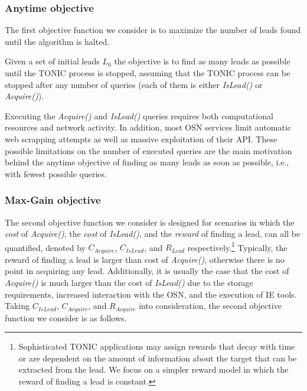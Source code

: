 \documentclass[journal]{IEEEtran}
\newcommand{\islead}[1]{{\em IsLead(#1)}}
\newcommand{\acquire}[1]{{\em Acquire(#1)}}
\begin{document}


\subsubsection{Anytime objective}

The first objective function we consider is to maximize the number of leads found until the algorithm is halted. 



\begin{definition}
Given a set of initial leads \(L_0\) the objective is to find as many leads as possible until the TONIC process is stopped, assuming that the TONIC process can be stopped after any number of queries (each of them is either \islead{} or \acquire{}).
\label{def:budget}
\end{definition}

Executing the \acquire{} and \islead{} queries requires both computational resources and network activity. 
In addition, most OSN services limit automatic web scrapping attempts as well as massive exploitation of their API. 
These possible limitations on the number of executed queries are the main motivation behind the anytime objective of finding as many leads as soon as possible, i.e., with fewest possible queries.  

\subsubsection{Max-Gain objective}

The second objective function we consider is designed for scenarios in which 
the {\em cost} of \acquire{}, the {\em cost} of \islead{}, and the {\em reward} of finding a lead, can all be quantified, denoted by $C_{Acquire}$, $C_{IsLead}$, and $R_{Lead}$ respectively.\footnote{Sophisticated TONIC applications may assign rewards that decay with time or are dependent on the amount of information about the target that can be extracted from the lead. We focus on a simpler reward model in which the reward of finding a lead is constant.} 
Typically, the reward of finding a lead is larger than cost of \acquire{}, otherwise there is no point in acquiring any lead. Additionally, it is usually the case that the cost of \acquire{} is much larger than the cost of \islead{} due to the storage requirements, increased interaction with the OSN, and the execution of IE tools. Taking $C_{IsLead}$, $C_{Acquire}$, and $R_{Acquire}$ into consideration, the second objective function we consider is as follows.
\end{document}
